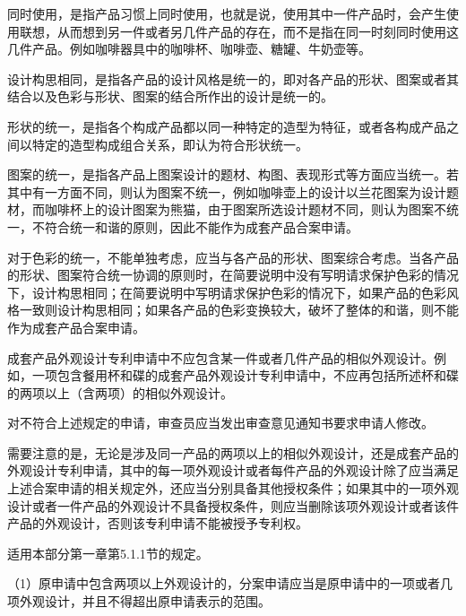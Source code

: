 同时使用，是指产品习惯上同时使用，也就是说，使用其中一件产品时，会产生使用联想，从而想到另一件或者另几件产品的存在，而不是指在同一时刻同时使用这几件产品。例如咖啡器具中的咖啡杯、咖啡壶、糖罐、牛奶壶等。

设计构思相同，是指各产品的设计风格是统一的，即对各产品的形状、图案或者其结合以及色彩与形状、图案的结合所作出的设计是统一的。

形状的统一，是指各个构成产品都以同一种特定的造型为特征，或者各构成产品之间以特定的造型构成组合关系，即认为符合形状统一。

图案的统一，是指各产品上图案设计的题材、构图、表现形式等方面应当统一。若其中有一方面不同，则认为图案不统一，例如咖啡壶上的设计以兰花图案为设计题材，而咖啡杯上的设计图案为熊猫，由于图案所选设计题材不同，则认为图案不统一，不符合统一和谐的原则，因此不能作为成套产品合案申请。

对于色彩的统一，不能单独考虑，应当与各产品的形状、图案综合考虑。当各产品的形状、图案符合统一协调的原则时，在简要说明中没有写明请求保护色彩的情况下，设计构思相同；在简要说明中写明请求保护色彩的情况下，如果产品的色彩风格一致则设计构思相同；如果各产品的色彩变换较大，破坏了整体的和谐，则不能作为成套产品合案申请。

成套产品外观设计专利申请中不应包含某一件或者几件产品的相似外观设计。例如，一项包含餐用杯和碟的成套产品外观设计专利申请中，不应再包括所述杯和碟的两项以上（含两项）的相似外观设计。

对不符合上述规定的申请，审查员应当发出审查意见通知书要求申请人修改。

需要注意的是，无论是涉及同一产品的两项以上的相似外观设计，还是成套产品的外观设计专利申请，其中的每一项外观设计或者每件产品的外观设计除了应当满足上述合案申请的相关规定外，还应当分别具备其他授权条件；如果其中的一项外观设计或者一件产品的外观设计不具备授权条件，则应当删除该项外观设计或者该件产品的外观设计，否则该专利申请不能被授予专利权。

适用本部分第一章第5.1.1节的规定。

{\setlength{\parindent}{17.1bp}（1）原申请中包含两项以上外观设计的，分案申请应当是原申请中的一项或者几项外观设计，并且不得超出原申请表示的范围。\par}

